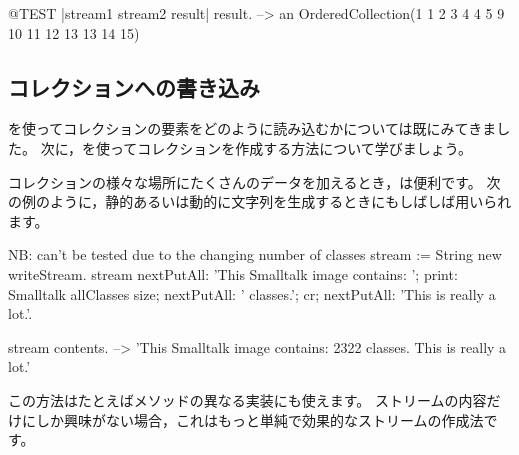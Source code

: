\documentclass[a4paper,10pt,twoside]{book}
\begin{document}
{\begin{code}{@TEST |stream1 stream2 result|}
result. -->   an OrderedCollection(1 1 2 3 4 4 5 9 10 11 12 13 13 14 15)
\end{code}

\subsection{コレクションへの書き込み}

を使ってコレクションの要素をどのように読み込むかについては既にみてきました。
次に，を使ってコレクションを作成する方法について学びましょう。

コレクションの様々な場所にたくさんのデータを加えるとき，は便利です。
次の例のように，静的あるいは動的に文字列を生成するときにもしばしば用いられます。


\begin{code}{NB: can't be tested due to the changing number of classes}
stream := String new writeStream.
stream
  nextPutAll: 'This Smalltalk image contains: ';
  print: Smalltalk allClasses size;
  nextPutAll: ' classes.';
  cr;
  nextPutAll: 'This is really a lot.'.

stream contents. --> 'This Smalltalk image contains: 2322 classes.
This is really a lot.'
\end{code}

この方法はたとえばメソッドの異なる実装にも使えます。
ストリームの内容だけにしか興味がない場合，これはもっと単純で効果的なストリームの作成法です。


}
\end{document}
